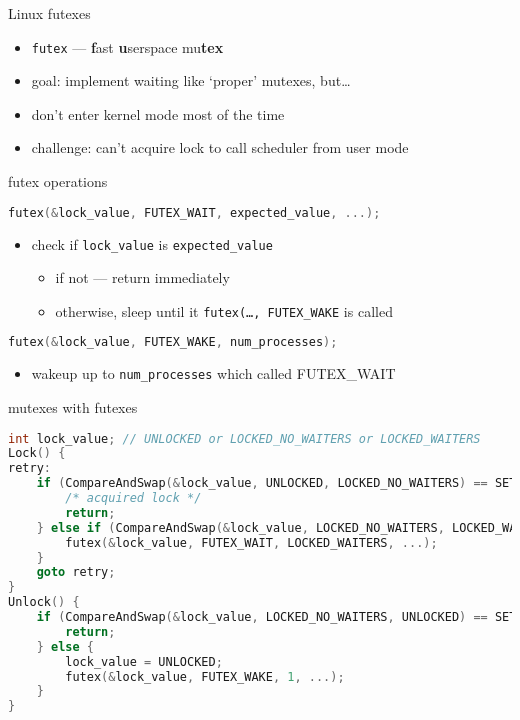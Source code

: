 \begin{frame}{Linux futexes}
\begin{itemize}
\item \texttt{futex} --- \textbf{f}ast \textbf{u}serspace mu\textbf{tex}
\item goal: implement waiting like `proper' mutexes, but\ldots
\item don't enter kernel mode most of the time
\vspace{.5cm}
\item challenge: can't acquire lock to call scheduler from user mode
\end{itemize}
\end{frame}

\begin{frame}[fragile,label=futexOp]{futex operations}
\begin{lstlisting}[language=C++,style=small]
futex(&lock_value, FUTEX_WAIT, expected_value, ...);
\end{lstlisting}
\begin{itemize}
\item check if \texttt{lock\_value} is \texttt{expected\_value}
    \begin{itemize}
    \item if not --- return immediately
    \item otherwise, sleep until it \texttt{futex(\ldots, FUTEX\_WAKE} is called
    \end{itemize}
\end{itemize}
\begin{lstlisting}[language=C++,style=small]
futex(&lock_value, FUTEX_WAKE, num_processes);
\end{lstlisting}
\begin{itemize}
\item wakeup up to \texttt{num\_processes} which called FUTEX\_WAIT
\end{itemize}
\end{frame}

\begin{frame}[fragile,label=futexMutex]{mutexes with futexes}
\begin{lstlisting}[language=C++,style=smaller]
int lock_value; // UNLOCKED or LOCKED_NO_WAITERS or LOCKED_WAITERS
Lock() {
retry:
    if (CompareAndSwap(&lock_value, UNLOCKED, LOCKED_NO_WAITERS) == SET) {
        /* acquired lock */
        return;
    } else if (CompareAndSwap(&lock_value, LOCKED_NO_WAITERS, LOCKED_WAITERS) == SET) {
        futex(&lock_value, FUTEX_WAIT, LOCKED_WAITERS, ...);
    }
    goto retry;
}
Unlock() {
    if (CompareAndSwap(&lock_value, LOCKED_NO_WAITERS, UNLOCKED) == SET) {
        return;
    } else {
        lock_value = UNLOCKED;
        futex(&lock_value, FUTEX_WAKE, 1, ...);
    }
}
\end{lstlisting}
\end{frame}


